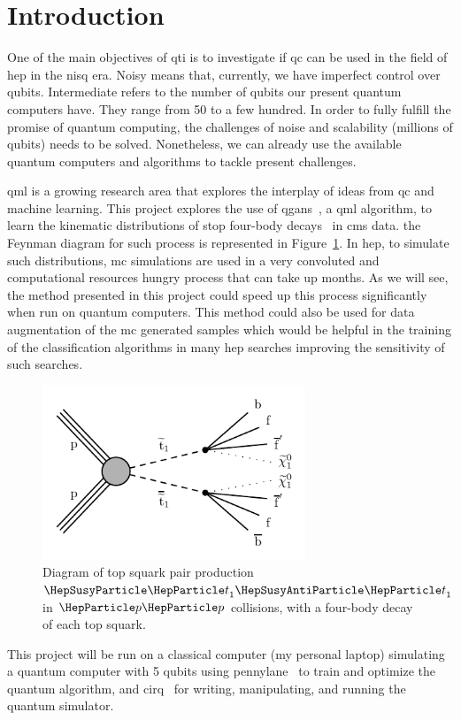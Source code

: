 \section{Introduction}
\label{sec:intro}

One of the main objectives of \gls{qti} is to investigate if \gls{qc} can be 
used in the field of \gls{hep} in the \gls{nisq} era. Noisy means that, currently,
we have imperfect control over qubits. Intermediate refers to the number of qubits
our present quantum computers have. They range from 50 to a few hundred. 
In order to fully fulfill the promise of quantum computing, the challenges of
noise and scalability (millions of qubits) needs to be solved. Nonetheless, we
can already use the available quantum computers and algorithms to tackle present
challenges. 

\gls{qml} is a growing research area that explores the interplay of ideas from \gls{qc} 
and machine learning. This project explores the use of \glspl{qgan}~\cite{Zoufal_2019}, 
a \gls{qml} algorithm, to learn the kinematic distributions of stop four-body 
decays~\cite{ph-brief-stop} in \gls{cms} data. the Feynman diagram for such process 
is represented in Figure~\ref{fig:model}. In \gls{hep}, to simulate such 
distributions, \gls{mc} simulations are used in a very convoluted and computational
resources hungry process that can take up months. As we will see, the method 
presented in this project could speed up this process significantly when run on 
quantum computers. This method could also be used for data augmentation of the 
\gls{mc} generated samples which would be helpful in the training of the 
classification algorithms in many \gls{hep} searches improving the sensitivity of
such searches.

\clearpage

\begin{figure}[!htbp]
\centering
\includegraphics[width=0.70\textwidth]{figures/Figure_001.pdf}
\caption{Diagram of top squark pair production $\stp \stpb$ in $\Pp\Pp$ collisions, 
with a four-body decay of each top squark.}
\label{fig:model}
\end{figure}

This project will be run on a classical computer (my personal laptop) simulating
a quantum computer with 5 qubits using pennylane~\cite{pennylane} to train and 
optimize the quantum algorithm, and cirq~\cite{cirq} for writing, manipulating, 
and running the quantum simulator.